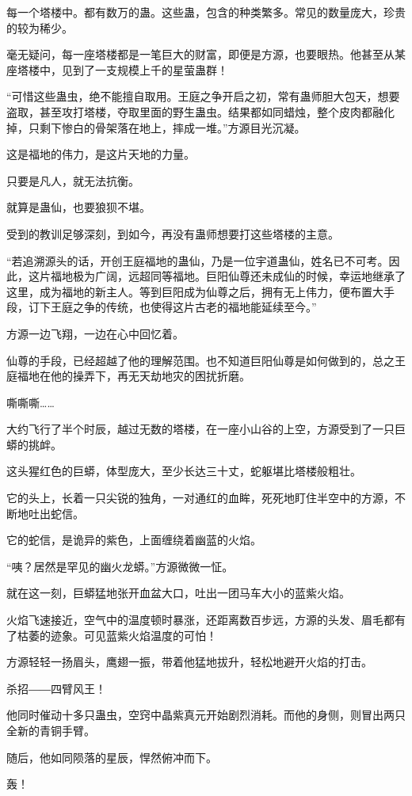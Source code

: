 \begin{this_body}
每一个塔楼中。都有数万的蛊。这些蛊，包含的种类繁多。常见的数量庞大，珍贵的较为稀少。

毫无疑问，每一座塔楼都是一笔巨大的财富，即便是方源，也要眼热。他甚至从某座塔楼中，见到了一支规模上千的星萤蛊群！

“可惜这些蛊虫，绝不能擅自取用。王庭之争开启之初，常有蛊师胆大包天，想要盗取，甚至攻打塔楼，夺取里面的野生蛊虫。结果都如同蜡烛，整个皮肉都融化掉，只剩下惨白的骨架落在地上，摔成一堆。”方源目光沉凝。

这是福地的伟力，是这片天地的力量。

只要是凡人，就无法抗衡。

就算是蛊仙，也要狼狈不堪。

受到的教训足够深刻，到如今，再没有蛊师想要打这些塔楼的主意。

“若追溯源头的话，开创王庭福地的蛊仙，乃是一位宇道蛊仙，姓名已不可考。因此，这片福地极为广阔，远超同等福地。巨阳仙尊还未成仙的时候，幸运地继承了这里，成为福地的新主人。等到巨阳成为仙尊之后，拥有无上伟力，便布置大手段，订下王庭之争的传统，也使得这片古老的福地能延续至今。”

方源一边飞翔，一边在心中回忆着。

仙尊的手段，已经超越了他的理解范围。也不知道巨阳仙尊是如何做到的，总之王庭福地在他的操弄下，再无天劫地灾的困扰折磨。

嘶嘶嘶……

大约飞行了半个时辰，越过无数的塔楼，在一座小山谷的上空，方源受到了一只巨蟒的挑衅。

这头猩红色的巨蟒，体型庞大，至少长达三十丈，蛇躯堪比塔楼般粗壮。

它的头上，长着一只尖锐的独角，一对通红的血眸，死死地盯住半空中的方源，不断地吐出蛇信。

它的蛇信，是诡异的紫色，上面缠绕着幽蓝的火焰。

“咦？居然是罕见的幽火龙蟒。”方源微微一怔。

就在这一刻，巨蟒猛地张开血盆大口，吐出一团马车大小的蓝紫火焰。

火焰飞速接近，空气中的温度顿时暴涨，还距离数百步远，方源的头发、眉毛都有了枯萎的迹象。可见蓝紫火焰温度的可怕！

方源轻轻一扬眉头，鹰翅一振，带着他猛地拔升，轻松地避开火焰的打击。

杀招――四臂风王！

他同时催动十多只蛊虫，空窍中晶紫真元开始剧烈消耗。而他的身侧，则冒出两只全新的青铜手臂。

随后，他如同陨落的星辰，悍然俯冲而下。

轰！


\end{this_body}
